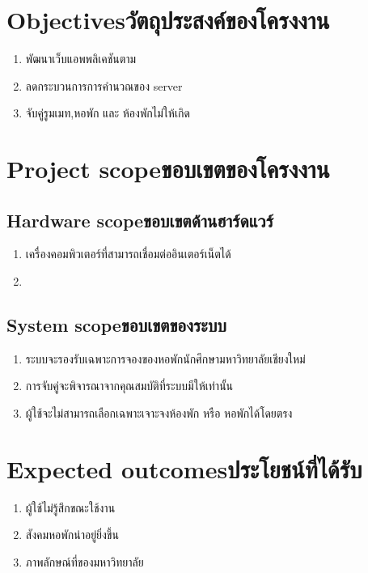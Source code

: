 \section{\ifenglish Objectives\else วัตถุประสงค์ของโครงงาน\fi}
\begin{enumerate}
    \item พัฒนาเว็บแอพพลิเคชันตาม
    \item ลดกระบวนการการคำนวณของ server
    \item จับคู่รูมเมท,หอพัก และ ห้องพักไม่ให้เกิด 
\end{enumerate}

\section{\ifenglish Project scope\else ขอบเขตของโครงงาน\fi}
\subsection{\ifenglish Hardware scope\else ขอบเขตด้านฮาร์ดแวร์\fi}
\begin{enumerate}
    \item เครื่องคอมพิวเตอร์ที่สามารถเชื่อมต่ออินเตอร์เน็ตได้
    \item {}
\end{enumerate}
\subsection{\ifenglish System scope\else ขอบเขตของระบบ\fi}
\begin{enumerate}
    \item ระบบจะรองรับเฉพาะการจองของหอพักนักศึกษามหาวิทยาลัยเชียงใหม่
    \item การจับคู่จะพิจารณาจากคุณสมบัติที่ระบบมีให้เท่านั้น
    \item ผู้ใช้จะไม่สามารถเลือกเฉพาะเจาะจงห้องพัก หรือ หอพักได้โดยตรง
\end{enumerate}

\section{\ifenglish Expected outcomes\else ประโยชน์ที่ได้รับ\fi}
\begin{enumerate}
    \item ผู้ใช้ไม่รู้สึกขณะใช้งาน
    \item สังคมหอพักน่าอยู่ยิ่งขึ้น
    \item ภาพลักษณ์ที่ของมหาวิทยาลัย
\end{enumerate}

